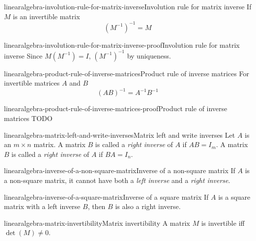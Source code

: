 \documentclass[preview]{standalone}
\begin{document}
\begin{snippetproposition}{linearalgebra-involution-rule-for-matrix-inverse}{Involution rule for matrix inverse}
    If \(M\) is an invertible matrix
    \[
        {(M^{-1})}^{-1} = M
    \]
\end{snippetproposition}

\begin{snippetproof}{linearalgebra-involution-rule-for-matrix-inverse-proof}{Involution rule for matrix inverse}
    Since \(M(M^{-1}) = I\), \({(M^{-1})}^{-1}\)
    by uniqueness. %
\end{snippetproof}

\begin{snippetproposition}{linearalgebra-product-rule-of-inverse-matrices}{Product rule of inverse matrices}
    For invertible matrices \(A\) and \(B\)
    \[
        {(AB)}^{-1} = A^{-1} B^{-1}
    \]
\end{snippetproposition}

\begin{snippetproof}{linearalgebra-product-rule-of-inverse-matrices-proof}{Product rule of inverse matrices}
    TODO
\end{snippetproof}

\begin{snippetdefinition}{linearalgebra-matrix-left-and-write-inverses}{Matrix left and write inverses}
    Let \(A\) is an \(m \times n\) matrix. A matrix \(B\)
    is called a \textit{right inverse} of \(A\)
    if \(AB=I_m\).
    A matrix \(B\) is called a \textit{right inverse} of \(A\)
    if \(BA=I_n\).
\end{snippetdefinition}

\begin{snippetproposition}{linearalgebra-inverse-of-a-non-square-matrix}{Inverse of a non-square matrix}
    If \(A\) is a non-square matrix, it cannot have
    both a \textit{left inverse} and a \textit{right inverse}.
\end{snippetproposition}

\begin{snippetproposition}{linearalgebra-inverse-of-a-square-matrix}{Inverse of a square matrix}
    If \(A\) is a square matrix
    with a left inverse \(B\),
    then \(B\) is also a right inverse.
\end{snippetproposition}

\begin{snippetproposition}{linearalgebra-matrix-invertibility}{Matrix invertibility}
    A matrix \(M\) is invertible iff
    \(\det(M) \neq 0\).
\end{snippetproposition}
\end{document}
